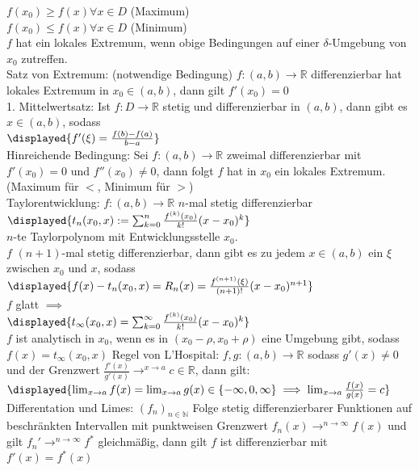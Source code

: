 \documentclass[9pt, landscape,a4paper]{extarticle}
\begin{document}
\begin{multicols*}{4}
  $f(x_0) \geq f(x) \forall x \in D$ (Maximum) \\
  $f(x_0) \leq f(x) \forall x \in D$ (Minimum) \\
  $f$ hat ein lokales Extremum, wenn obige Bedingungen auf einer $\delta$-Umgebung von $x_0$ zutreffen. \\
  Satz von Extremum: (notwendige Bedingung) $f:(a,b) \to \mathbb{R}$ differenzierbar hat lokales Extremum in $x_0 \in (a,b)$, dann gilt $f'(x_0) = 0$ \\
  1. Mittelwertsatz: Ist $f:D\to\mathbb{R}$ stetig und differenzierbar in $(a,b)$, dann gibt es $x\in (a,b)$, sodass \\
  $\displayed{f'(\xi) = \frac{f(b) - f(a)}{b - a}}$ \\
  Hinreichende Bedingung: Sei $f:(a,b) \to \mathbb{R}$ zweimal differenzierbar mit $f'(x_0) = 0$ und $f''(x_0) \neq 0$, dann folgt $f$ hat in $x_0$ ein lokales Extremum.
  (Maximum für $<$, Minimum für $>$) \\
  Taylorentwicklung: $f:(a,b) \to \mathbb{R}$ $n$-mal stetig differenzierbar \\
  $\displayed{t_n(x_0, x) := \sum_{k = 0}^n \frac{f^{(k)}(x_0)}{k!}(x - x_0)^k}$ \\
  $n$-te Taylorpolynom mit Entwicklungsstelle $x_0$. \\
  $f$ $(n + 1)$-mal stetig differenzierbar, dann gibt es zu jedem $x\in (a,b)$ ein $\xi$ zwischen $x_0$ und $x$, sodass \\
  $\displayed{f(x) - t_n(x_0, x) = R_n(x) = \frac{f^{(n + 1)}(\xi)}{(n + 1)!}(x - x_0)^{n + 1}}$ \\
  $f$ glatt $\implies$ \\
  $\displayed{t_\infty(x_0, x) = \sum_{k = 0}^\infty \frac{f^{(k)}(x_0)}{k!}(x - x_0)^k}$ \\
  $f$ ist analytisch in $x_0$, wenn es in $(x_0 - \rho, x_0 + \rho)$ eine Umgebung gibt, sodass $f(x) = t_\infty(x_0, x)$
  Regel von L'Hospital: $f, g:(a,b)\to\mathbb{R}$ sodass $g'(x) \neq 0$ und der Grenzwert $\frac{f'(x)}{g'(x)} \to^{x\rightarrow a} c \in \mathbb{R}$, dann gilt: \\
  $\displayed{\lim_{x\to a} f(x) = \lim_{x\to a} g(x) \in \{-\infty, 0, \infty\} \implies\lim_{x\to a}\frac{f(x)}{g(x)} = c}$
  Differentation und Limes: $(f_n)_{n\in\mathbb{N}}$ Folge stetig differenzierbarer Funktionen auf beschränkten Intervallen mit punktweisen Grenzwert $f_n (x) \to^{n\rightarrow\infty} f(x)$ und gilt $f_n' \to^{n\rightarrow\infty} f^\ast$ gleichmäßig, dann gilt $f$ ist differenzierbar mit $f'(x) = f^\ast(x)$

\end{multicols*}
\end{document}
